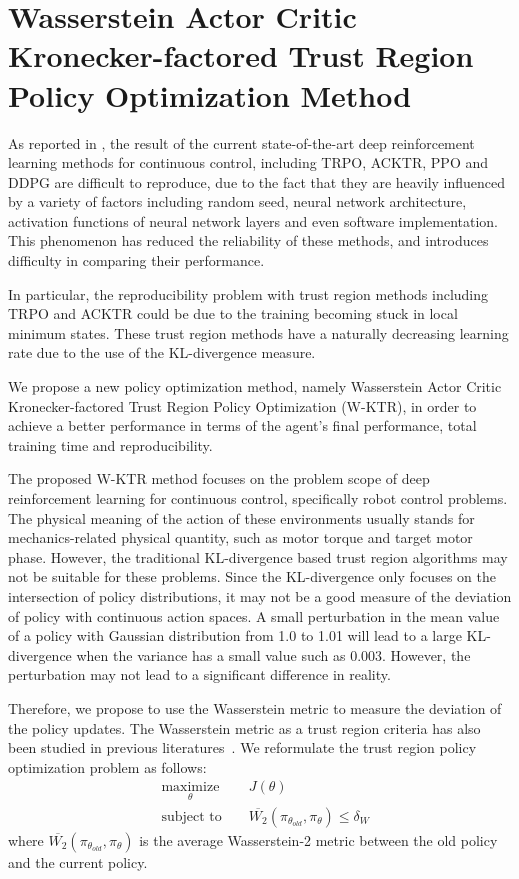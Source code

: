 \section{Wasserstein Actor Critic Kronecker-factored Trust Region Policy Optimization Method }
As reported in \cite{henderson2017matters}, the result of the current state-of-the-art deep reinforcement learning methods for continuous control, including TRPO, ACKTR, PPO and DDPG are difficult to reproduce, due to the fact that they are heavily influenced by a variety of factors including random seed, neural network architecture, activation functions of neural network layers and even software implementation. This phenomenon has reduced the reliability of these methods, and introduces difficulty in comparing their performance.

In particular, the reproducibility problem with trust region methods including TRPO and ACKTR could be due to the training becoming stuck in local minimum states. These trust region methods have a naturally decreasing learning rate due to the use of the KL-divergence measure. 

We propose a new policy optimization method, namely Wasserstein Actor Critic Kronecker-factored Trust Region Policy Optimization (W-KTR), in order to achieve a better performance in terms of the agent's final performance, total training time and reproducibility.

The proposed W-KTR method focuses on the problem scope of deep reinforcement learning for continuous control, specifically robot control problems. The physical meaning of the action of these environments usually stands for mechanics-related physical quantity, such as motor torque and target motor phase. However, the traditional KL-divergence based trust region algorithms may not be suitable for these problems. Since the KL-divergence only focuses on the intersection of policy distributions, it may not be a good measure of the deviation of policy with continuous action spaces. A small perturbation in the mean value of a policy with Gaussian distribution from 1.0 to 1.01 will lead to a large KL-divergence when the variance has a small value such as 0.003. However, the perturbation may not lead to a significant difference in reality.

Therefore, we propose to use the Wasserstein metric to measure the deviation of the policy updates. The Wasserstein metric as a trust region criteria has also been studied in previous literatures~\cite{tolstikhin2017wasserstein}. We reformulate the trust region policy optimization problem as follows:
\begin{equation}
    \begin{aligned}
&    \underset{\theta}{\text{maximize}} 
&& J(\theta) \\
& \text{subject to } 
&& \overline{W_2}(\pi_{\theta_{old}},\pi_\theta) \leq \delta_{W}\end{aligned}
\end{equation}
where $ \overline{W_2}(\pi_{\theta_{old}},\pi_\theta)$ is the average Wasserstein-2 metric between the old policy and the current policy.

